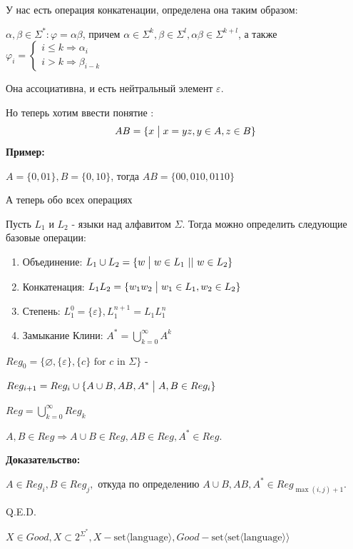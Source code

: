 У нас есть операция конкатенации, определена она таким образом:

$\alpha, \beta \in \Sigma^*: \varphi = \alpha \beta$, причем $\alpha \in \Sigma^k, \beta \in \Sigma^l, \alpha\beta \in \Sigma^{k+l}$, а также $\varphi_i =\begin{cases}
    i \leq k \Rightarrow \alpha_i\\
    i > k \Rightarrow \beta_{i-k}
\end{cases}
$

Она ассоциативна, и есть нейтральный элемент $\varepsilon$.

Но теперь хотим ввести понятие :
$$AB = \{x \bigm| x = yz, y \in A,z \in B\}$$
\textbf{Пример:}

$A = \{0,01\}, B = \{0,10\}$, тогда $AB = \{00,010,0110\}$

А теперь обо всех операциях 

Пусть $L_1$ и $L_2$ - языки над алфавитом $\Sigma$. Тогда можно определить следующие базовые операции:
\begin{enumerate}
    \item Объединение: $L_1 \cup L_2 = \{w \bigm| w \in L_1\,\,  ||\,\, w \in L_2\}$
    \item  Конкатенация: $L_1 L_2 = \{w_1 w_2 \bigm| w_1 \in L_1, w_2 \in L_2\}$

    \item Степень: $L_1^0 = \{\varepsilon\},L_1^{n+1}=L_1L_1^n$

    \item Замыкание Клини: $A^* = \bigcup\limits_{k=0}^\infty A^k$
\end{enumerate}



$Reg_0 =\{\varnothing, \{\varepsilon\}, \{c\} \text{ for $c$ in $\Sigma$}\}$ - 

$Reg_{i+1} = Reg_i \cup \{A\cup B,AB,A^* \bigm| A,B \in Reg_i\}$

 $Reg = \bigcup\limits_{k=0}^\infty Reg_k$


$A,B \in Reg \Rightarrow A \cup B \in Reg, AB \in Reg, A^* \in Reg$.

\textbf{Доказательство:}

$A \in Reg_i, B \in Reg_j,$ откуда по определению $A \cup B, AB, A^* \in Reg_{\max(i,j)+1}$.

\hfill Q.E.D.

$X\in Good, X \subset 2^{\Sigma^*}, X - \text{set$\langle$language$\rangle$}, Good  -\text{set$\langle$set$\langle $language$\rangle\rangle$}$ 

